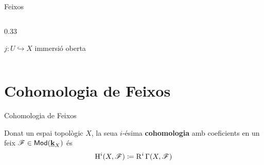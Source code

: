 \documentclass[notheorems, aspectratio=169]{beamer}
\begin{document}
\begin{frame}[fragile]{Feixos}
\begin{columns}[T]
\begin{column}{0.33\textwidth}
{\begin{block}{\(j\colon U \hookrightarrow X\) immersió oberta}
\begin{center}
          \end{center}
        \end{block}
      }
    \end{column}
  \end{columns}
\end{frame}


\section{Cohomologia de Feixos}
\begin{frame}{Cohomologia de Feixos}
  \begin{definition}
    Donat un espai topològic \(X\), la seua \(i\)-ésima \textbf{cohomologia} amb coeficients en un feix \(\mathscr{F} \in \mathsf{Mod}(\underline{\mathbf{k}}_{X})\) és
    \begin{equation*}
      \operatorname{H}^{i}(X, \mathscr{F}) \coloneq \operatorname{R}^{i}\Gamma(X, \mathscr{F})
    \end{equation*}
  \end{definition}
\end{frame}
\end{document}
